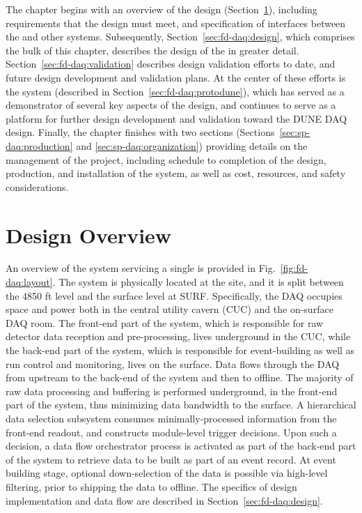 The chapter begins with an overview of the  design (Section~\ref{sec:fd-daq:overview}),
including requirements that the design must meet, and specification of
interfaces between the   and other   systems. 
Subsequently, Section~\ref{sec:fd-daq:design}, which comprises the
bulk of this chapter, describes the design of the 
 in greater detail.
Section~\ref{sec:fd-daq:validation} describes design validation efforts
to date, and future design development and validation plans. At the
center of these efforts is the 
  system (described in Section~\ref{sec:fd-daq:protodune}), which has served as a demonstrator of several
key aspects of the      design, and continues to serve as a
platform for further design development and validation toward the
DUNE DAQ design. 
Finally, the chapter finishes with two sections
(Sections~\ref{sec:sp-daq:production} and \ref{sec:sp-daq:organization}) providing details on
the management of the
 project, including schedule to completion of the design, 
production, and installation of the system, as well as cost, resources, and
safety considerations.

\section{Design Overview}
\label{sec:fd-daq:overview}

An overview of the    system 
servicing a single 
 is
provided in Fig.~\ref{fig:fd-daq:layout}. The system is
physically located at the  site, and it is split between the
4850 ft level and the surface level at SURF. Specifically, the DAQ occupies space and
power both in the central utility cavern (CUC) and the on-surface DAQ
room.  The front-end part of the system, which is responsible for
raw detector data reception and pre-processing, lives
underground in the CUC, while the back-end part of the system, which is responsible for
event-building as well as run control and monitoring, lives on the
surface. Data flows through the DAQ from 
upstream to the back-end of the system and then to offline. The majority
of raw data processing and buffering is performed underground, in the
front-end part of the system, thus minimizing data bandwidth to the surface. A
hierarchical data selection subsystem consumes minimally-processed
information from the front-end readout, and
constructs module-level trigger decisions. Upon such a decision, a data
flow orchestrator process is activated as part of the back-end part of
the system
to retrieve data to be built as part of an event record. At event
building stage, optional down-selection of the data is possible via
high-level filtering, prior to shipping the data to offline.  The
specifics of design implementation and data flow are described in Section~\ref{sec:fd-daq:design}.

